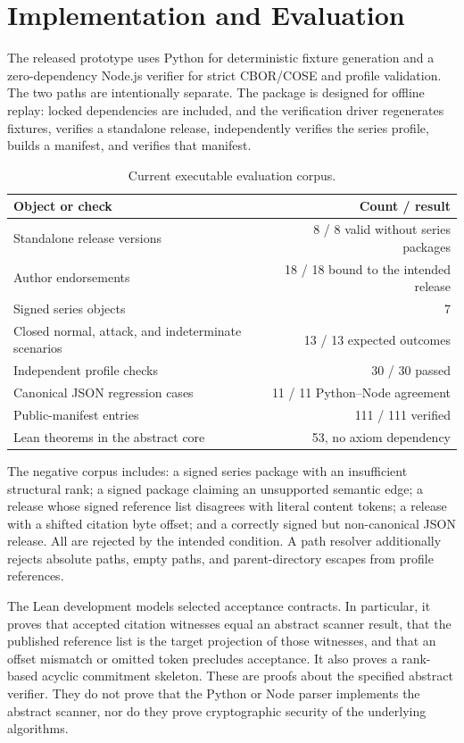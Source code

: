 \documentclass[11pt]{article}
\begin{document}
\section{Implementation and Evaluation}

The released prototype uses Python for deterministic fixture generation and a zero-dependency Node.js verifier for strict CBOR/COSE and profile validation. The two paths are intentionally separate. The package is designed for offline replay: locked dependencies are included, and the verification driver regenerates fixtures, verifies a standalone release, independently verifies the series profile, builds a manifest, and verifies that manifest.

\begin{table}[t]
\centering
\caption{Current executable evaluation corpus.}
\begin{tabular}{lr}
\toprule
Object or check & Count / result \\
\midrule
Standalone release versions & 8 / 8 valid without series packages \\
Author endorsements & 18 / 18 bound to the intended release \\
Signed series objects & 7 \\
Closed normal, attack, and indeterminate scenarios & 13 / 13 expected outcomes \\
Independent profile checks & 30 / 30 passed \\
Canonical JSON regression cases & 11 / 11 Python--Node agreement \\
Public-manifest entries & 111 / 111 verified \\
Lean theorems in the abstract core & 53, no axiom dependency \\
\bottomrule
\end{tabular}
\end{table}

The negative corpus includes: a signed series package with an insufficient structural rank; a signed package claiming an unsupported semantic edge; a release whose signed reference list disagrees with literal content tokens; a release with a shifted citation byte offset; and a correctly signed but non-canonical JSON release. All are rejected by the intended condition. A path resolver additionally rejects absolute paths, empty paths, and parent-directory escapes from profile references.

The Lean development models selected acceptance contracts. In particular, it proves that accepted citation witnesses equal an abstract scanner result, that the published reference list is the target projection of those witnesses, and that an offset mismatch or omitted token precludes acceptance. It also proves a rank-based acyclic commitment skeleton. These are proofs about the specified abstract verifier. They do not prove that the Python or Node parser implements the abstract scanner, nor do they prove cryptographic security of the underlying algorithms.
\end{document}
